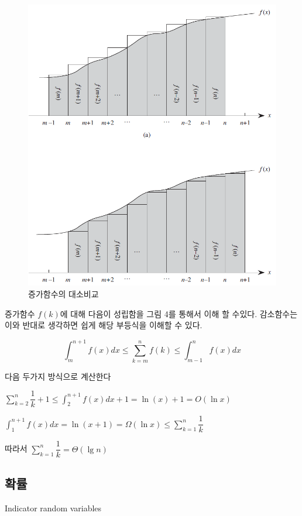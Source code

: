 \begin{figure}[h!]
    \centering
    \includegraphics[scale=0.5]{./QuickSort/pic/q5.png}
    \caption{증가함수의 대소비교\cite{reference1}}
\end{figure}

증가함수 $f(k)$에 대해 다음이 성립함을 그림 4를 통해서 이해 할 수있다. 감소함수는 이와 반대로 생각하면 쉽게 해당 부등식을 이해할 수 있다.

$$\int_{m}^{n+1}f(x)dx \le \sum_{k=m}^n f(k) \le \int_{m-1}^{n}f(x)dx$$

다음 두가지 방식으로 계산한다

$\sum_{k=2}^n \dfrac{1}{k}+1 \le \int_{2}^{n+1}f(x)dx +1= \ln (x)+1 = O(\ln x)$

$\int_{1}^{n+1}f(x)dx =\ln (x+1) = \Omega(\ln x) \le \sum_{k=1}^n \dfrac{1}{k} $

따라서 $\sum_{k=1}^n \dfrac{1}{k} = \Theta(\lg n)$



\subsection{확률} Indicator random variables

